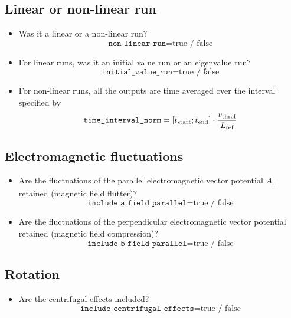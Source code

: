 \documentclass[a4paper]{report}
\begin{document}
\subsection{Linear or non-linear run} \label{sec:runtype}
\begin{itemize}
    \item Was it a linear or a non-linear run?
	$$\texttt{non\_linear\_run}= \textrm{true / false}$$     
    \item For linear runs, was it an initial value run or an eigenvalue run?
	$$\texttt{initial\_value\_run}= \textrm{true / false}$$         
    \item For non-linear runs, all the outputs are time averaged over the interval specified by
    $$\texttt{time\_interval\_norm}=[t_\textrm{start} ; t_\textrm{end}]\cdot\frac{v_\textrm{thref}}{L_{\textrm{ref}}}$$
\end{itemize}
\subsection{Electromagnetic fluctuations} \label{em:switches}
\begin{itemize}
	\item Are the fluctuations of the parallel electromagnetic vector potential $A_\parallel$ retained (magnetic field flutter)? 
	$$\texttt{include\_a\_field\_parallel}= \textrm{true / false}$$ 
	\item Are the fluctuations of the perpendicular electromagnetic vector potential retained (magnetic field compression)?
	$$\texttt{include\_b\_field\_parallel}= \textrm{true / false}$$ 
\end{itemize}
\subsection{Rotation} \label{sec:rotswitches}
\begin{itemize}
	\item Are the centrifugal effects included?  
	$$\texttt{include\_centrifugal\_effects}= \textrm{true / false}$$ 
\end{itemize}
\end{document}
